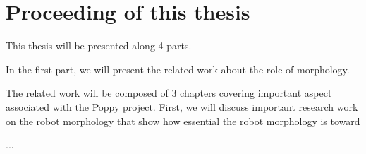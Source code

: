 \section*{Proceeding of this thesis} %


This thesis will be presented along 4 parts.

In the first part, we will present the related work about the role of morphology.

The related work will be composed of 3 chapters covering important aspect associated with the Poppy project. First, we will discuss important research work on the robot morphology that show how essential the robot morphology is toward

...








